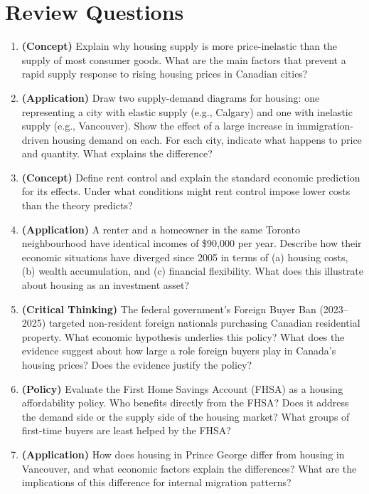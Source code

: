 \section*{Review Questions}

\begin{enumerate}

\item \textbf{(Concept)} Explain why housing supply is more price-inelastic than the supply of most consumer goods. What are the main factors that prevent a rapid supply response to rising housing prices in Canadian cities?

\item \textbf{(Application)} Draw two supply-demand diagrams for housing: one representing a city with elastic supply (e.g., Calgary) and one with inelastic supply (e.g., Vancouver). Show the effect of a large increase in immigration-driven housing demand on each. For each city, indicate what happens to price and quantity. What explains the difference?

\item \textbf{(Concept)} Define rent control and explain the standard economic prediction for its effects. Under what conditions might rent control impose lower costs than the theory predicts?

\item \textbf{(Application)} A renter and a homeowner in the same Toronto neighbourhood have identical incomes of \$90,000 per year. Describe how their economic situations have diverged since 2005 in terms of (a) housing costs, (b) wealth accumulation, and (c) financial flexibility. What does this illustrate about housing as an investment asset?

\item \textbf{(Critical Thinking)} The federal government's Foreign Buyer Ban (2023--2025) targeted non-resident foreign nationals purchasing Canadian residential property. What economic hypothesis underlies this policy? What does the evidence suggest about how large a role foreign buyers play in Canada's housing prices? Does the evidence justify the policy?

\item \textbf{(Policy)} Evaluate the First Home Savings Account (FHSA) as a housing affordability policy. Who benefits directly from the FHSA? Does it address the demand side or the supply side of the housing market? What groups of first-time buyers are least helped by the FHSA?

\item \textbf{(Application)} How does housing in Prince George differ from housing in Vancouver, and what economic factors explain the differences? What are the implications of this difference for internal migration patterns?

\end{enumerate}

